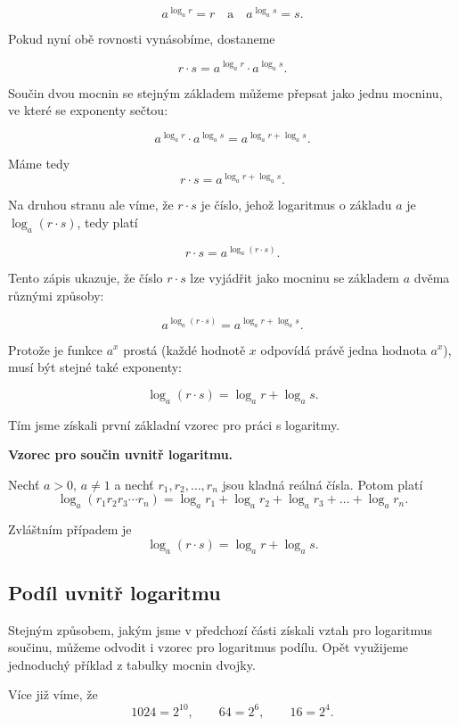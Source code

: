 \documentclass[12pt,a4paper]{article}
\begin{document}
\[
a^{\log_a r} = r
\quad\text{a}\quad
a^{\log_a s} = s.
\]

Pokud nyní obě rovnosti vynásobíme, dostaneme

\[
r \cdot s = a^{\log_a r} \cdot a^{\log_a s}.
\]

Součin dvou mocnin se stejným základem můžeme přepsat jako jednu mocninu, ve
které se exponenty sečtou:

\[
a^{\log_a r} \cdot a^{\log_a s} = a^{\log_a r + \log_a s}.
\]

Máme tedy
\[
r \cdot s = a^{\log_a r + \log_a s}.
\]

Na druhou stranu ale víme, že $r \cdot s$ je číslo, jehož logaritmus o základu $a$
je $\log_a (r \cdot s)$, tedy platí

\[
r \cdot s = a^{\log_a (r \cdot s)}.
\]

Tento zápis ukazuje, že číslo $r \cdot s$ lze vyjádřit jako mocninu se základem $a$
dvěma různými způsoby:

\[
a^{\log_a (r \cdot s)} = a^{\log_a r + \log_a s}.
\]

Protože je funkce $a^x$ prostá (každé hodnotě $x$ odpovídá právě jedna hodnota
$a^x$), musí být stejné také exponenty:

\[
\log_a (r \cdot s) = \log_a r + \log_a s.
\]

Tím jsme získali první základní vzorec pro práci s logaritmy.

\begin{definitionbox}
\textbf{Vzorec pro součin uvnitř logaritmu.}

Nechť $a>0$, $a\neq 1$ a nechť $r_1, r_2, \dots, r_n$ jsou kladná reálná čísla. Potom platí
\[
\log_a(r_1 r_2 r_3 \cdots r_n)
=
\log_a r_1 + \log_a r_2 + \log_a r_3 + \dots + \log_a r_n.
\]

Zvláštním případem je
\[
\log_a(r \cdot s) = \log_a r + \log_a s.
\]
\end{definitionbox}



\subsection*{Podíl uvnitř logaritmu}

Stejným způsobem, jakým jsme v předchozí části získali vztah pro logaritmus součinu,
můžeme odvodit i vzorec pro logaritmus podílu. Opět využijeme jednoduchý příklad
z tabulky mocnin dvojky.

Více již víme, že
\[
1024 = 2^{10}, \qquad 64 = 2^{6}, \qquad 16 = 2^{4}.
\]
\end{document}
